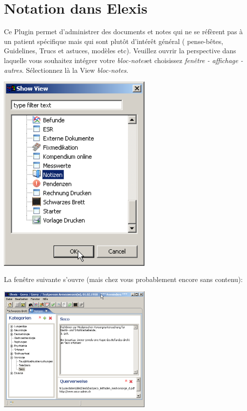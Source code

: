 
\section{Notation dans Elexis}
Ce Plugin permet d'administrer des documents et notes qui ne se réfèrent pas à un patient spécifique mais qui sont plutôt d'intérêt général ( pense-bêtes, Guidelines, Trucs et astuces, modèles etc). Veuillez ouvrir la perspective dans laquelle vous souhaitez intégrer votre \textit{bloc-notes}et choisissez \textit{fenêtre - affichage - autres}. Sélectionnez là la View \textit{bloc-notes}.

\includegraphics[width=3in]{images/notizen1}

La fenêtre suivante s'ouvre (mais chez vous probablement encore sans contenu):

\includegraphics[width=3in]{images/notizen2}

